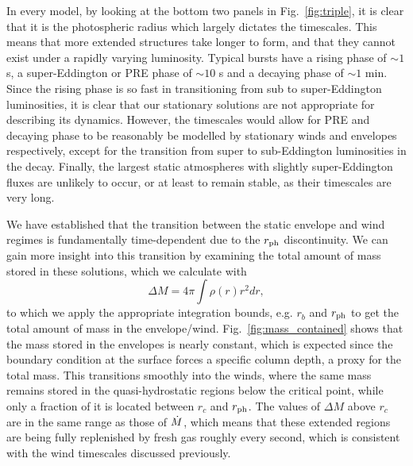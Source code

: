 \documentclass[../main.tex]{subfiles}
\begin{document}
In every model, by looking at the bottom two panels in Fig.~\ref{fig:triple}, it is clear that it is the photospheric radius which largely dictates the timescales. This means that more extended structures take longer to form, and that they cannot exist under a rapidly varying luminosity. Typical bursts have a rising phase of $\sim1$ s, a super-Eddington or PRE phase of $\sim10$ s and a decaying phase of $\sim1$ min.  Since the rising phase is so fast in transitioning from sub to super-Eddington luminosities, it is clear that our stationary solutions are not appropriate for describing its dynamics. However, the timescales would allow for PRE and decaying phase to be reasonably be modelled by stationary winds and envelopes respectively, except for the transition from super to sub-Eddington luminosities in the decay.  Finally, the largest static atmospheres with slightly super-Eddington fluxes are unlikely to occur, or at least to remain stable, as their timescales are very long.

We have established that the transition between the static envelope and wind regimes is fundamentally time-dependent due to the $r_\text{ph}$ discontinuity. We can gain more insight into this transition by examining the total amount of mass stored in these solutions, which we calculate with
\begin{equation}
    \Delta M=4\pi \int \rho(r)r^2dr,
\end{equation}
to which we apply the appropriate integration bounds, e.g. $r_b$ and $r_\text{ph}$ to get the total amount of mass in the envelope/wind. Fig.~\ref{fig:mass_contained} shows that the mass stored in the envelopes is nearly constant, which is expected since the boundary condition at the surface forces a specific column depth, a proxy for the total mass. This transitions smoothly into the winds, where the same mass remains stored in the quasi-hydrostatic regions below the critical point, while only a fraction of it is located between $r_c$ and $r_\text{ph}$. The values of $\Delta M$ above $r_c$ are in the same range as those of $\dot{M}$, which means that these extended regions are being fully replenished by fresh gas roughly every second, which is consistent with the wind timescales discussed previously.
\end{document}
